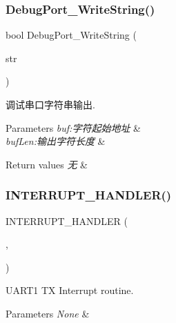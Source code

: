 \subsubsection{\texorpdfstring{Debug\+Port\+\_\+\+Write\+String()}{DebugPort\_WriteString()}}
{\footnotesize\ttfamily bool Debug\+Port\+\_\+\+Write\+String (\begin{DoxyParamCaption}\item[{const char $\ast$}]{str }\end{DoxyParamCaption})}



调试串口字符串输出. 


\begin{DoxyParams}{Parameters}
{\em buf\+:字符起始地址} & \\
\hline
{\em buf\+Len\+:输出字符长度} & \\
\hline
\end{DoxyParams}

\begin{DoxyRetVals}{Return values}
{\em 无} & \\
\hline
\end{DoxyRetVals}
\mbox{\label{group___debug_port_ga2a5290e9c002b3c40f94b7d42ca49d16}} 
\subsubsection{\texorpdfstring{I\+N\+T\+E\+R\+R\+U\+P\+T\+\_\+\+H\+A\+N\+D\+L\+E\+R()}{INTERRUPT\_HANDLER()}\hspace{0.1cm}{\footnotesize\ttfamily [1/2]}}
{\footnotesize\ttfamily I\+N\+T\+E\+R\+R\+U\+P\+T\+\_\+\+H\+A\+N\+D\+L\+ER (\begin{DoxyParamCaption}\item[{U\+A\+R\+T1\+\_\+\+T\+X\+\_\+\+I\+R\+Q\+Handler}]{,  }\item[{17}]{ }\end{DoxyParamCaption})}



U\+A\+R\+T1 TX Interrupt routine. 


\begin{DoxyParams}{Parameters}
{\em None} & \\
\hline
\end{DoxyParams}

